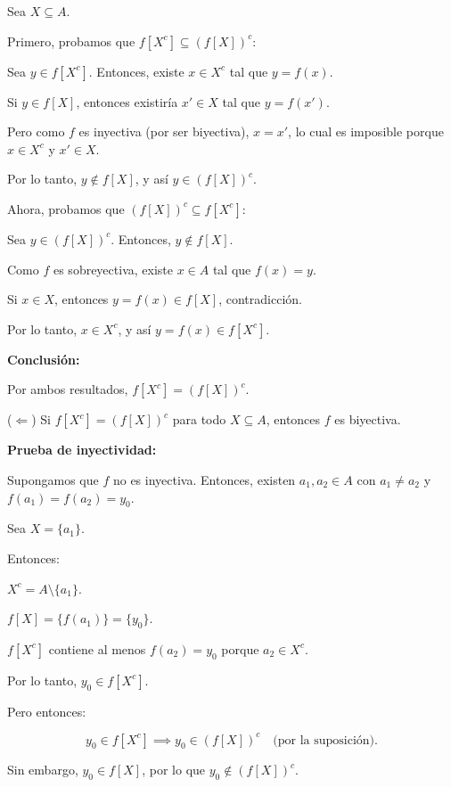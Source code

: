 \begin{solution}
\begin{enumerate}
    Sea \( X \subseteq A \).
    
    Primero, probamos que \( f[X^c] \subseteq (f[X])^c \):
    
    Sea \( y \in f[X^c] \). Entonces, existe \( x \in X^c \) tal que \( y = f(x) \).
    
    Si \( y \in f[X] \), entonces existiría \( x' \in X \) tal que \( y = f(x') \).
    
    Pero como \( f \) es inyectiva (por ser biyectiva), \( x = x' \), lo cual es imposible porque \( x \in X^c \) y \( x' \in X \).
    
    Por lo tanto, \( y \notin f[X] \), y así \( y \in (f[X])^c \).
    
    Ahora, probamos que \( (f[X])^c \subseteq f[X^c] \):
    
    Sea \( y \in (f[X])^c \). Entonces, \( y \notin f[X] \).
    
    Como \( f \) es sobreyectiva, existe \( x \in A \) tal que \( f(x) = y \).
    
    Si \( x \in X \), entonces \( y = f(x) \in f[X] \), contradicción.
    
    Por lo tanto, \( x \in X^c \), y así \( y = f(x) \in f[X^c] \).
    
    \textbf{Conclusión:}
    
    Por ambos resultados, \( f[X^c] = (f[X])^c \).
    
    ($\Leftarrow$) Si \( f[X^c] = (f[X])^c \) para todo \( X \subseteq A \), entonces \( f \) es biyectiva.
    
    \textbf{Prueba de inyectividad:}
    
    Supongamos que \( f \) no es inyectiva. Entonces, existen \( a_1, a_2 \in A \) con \( a_1 \neq a_2 \) y \( f(a_1) = f(a_2) = y_0 \).
    
    Sea \( X = \{ a_1 \} \).
    
    Entonces:
    
    \( X^c = A \setminus \{ a_1 \} \).
    
    \( f[X] = \{ f(a_1) \} = \{ y_0 \} \).
    
    \( f[X^c] \) contiene al menos \( f(a_2) = y_0 \) porque \( a_2 \in X^c \).
    
      Por lo tanto, \( y_0 \in f[X^c] \).
    
      Pero entonces:
    
      \[
      y_0 \in f[X^c] \implies y_0 \in (f[X])^c \quad \text{(por la suposición)}.
      \]
    
      Sin embargo, \( y_0 \in f[X] \), por lo que \( y_0 \notin (f[X])^c \).
    

\end{enumerate}
\end{solution}
